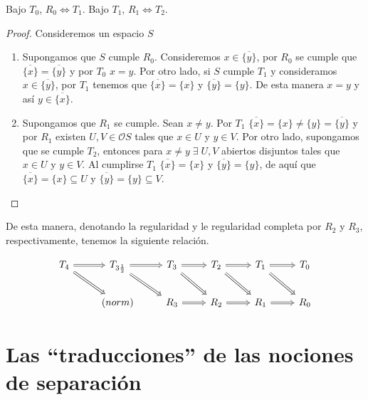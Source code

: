 \begin{prop}\label{R0 y R1}
    Bajo $T_0$, $R_0 \Leftrightarrow T_1$. Bajo $T_1$, $R_1 \Leftrightarrow T_2$.
\end{prop}

\begin{proof}
Consideremos un espacio $S$
    \begin{enumerate}[$i)$]
        \item Supongamos que $S$ cumple $R_0$. Consideremos $x\in \overline{\{y\}}$, por $R_0$ se cumple que $\overline{\{x\}}=\overline{\{y\}}$ y por $T_0$ $x=y$. Por otro lado, si $S$ cumple $T_1$ y consideramos $x\in \overline{\{y\}}$, por $T_1$ tenemos que $\overline{\{x\}}=\{x\}$ y $\overline{\{y\}}=\{y\}$. De esta manera $x=y$ y así $y\in \overline{\{x\}}$.
        \item Supongamos que $R_1$ se cumple. Sean $x\neq y$. Por $T_1$ $\overline{\{x\}}=\{x\}\neq \{y\}=\overline{\{y\}}$ y por $R_1$ existen $U, V\in\mathcal{O}S$ tales que $x\in U$ y $y\in V$. Por otro lado, supongamos que se cumple $T_2$, entonces para $x\neq y \;\exists\; U, V$ abiertos disjuntos tales que $x\in U$ y $y\in V$. Al cumplirse $T_1$  $\overline{\{x\}}=\{x\}$ y $\overline{\{y\}}=\{y\}$, de aquí que $\overline{\{x\}}=\{x\}\subseteq U$ y $\overline{\{y\}}=\{y\}\subseteq V$.
    \end{enumerate}
\end{proof}

De esta manera, denotando la regularidad y le regularidad completa por $R_2$ y $R_3$, respectivamente, tenemos la siguiente relación.

    \[\begin{tikzcd}
	{T_4} & {T_{3\frac{1}{2}}} & {T_3} & {T_2} & {T_1} & {T_0} \\
	& {(norm)} & {R_3} & {R_2} & {R_1} & {R_0}
	\arrow[Rightarrow, from=1-2, to=1-3]
	\arrow[Rightarrow, from=1-3, to=1-4]
	\arrow[Rightarrow, from=1-4, to=1-5]
	\arrow[Rightarrow, from=1-5, to=1-6]
	\arrow[Rightarrow, from=1-1, to=1-2]
	\arrow[Rightarrow, from=1-1, to=2-2]
	\arrow[Rightarrow, from=1-2, to=2-3]
	\arrow[Rightarrow, from=1-3, to=2-4]
	\arrow[Rightarrow, from=1-4, to=2-5]
	\arrow[Rightarrow, from=1-5, to=2-6]
	\arrow[Rightarrow, from=2-3, to=2-4]
	\arrow[Rightarrow, from=2-4, to=2-5]
	\arrow[Rightarrow, from=2-5, to=2-6]
\end{tikzcd}\]

\section{Las ``traducciones'' de las nociones de separación}

